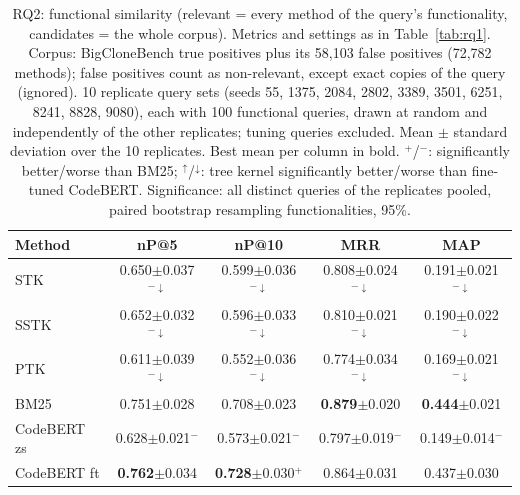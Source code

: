 \begin{table}[!htbp]
\centering
\caption{RQ2: functional similarity (relevant = every method of the query's functionality, candidates = the whole corpus). Metrics and settings as in Table~\ref{tab:rq1}. Corpus: BigCloneBench true positives plus its 58,103 false positives (72,782 methods); false positives count as non-relevant, except exact copies of the query (ignored). 10 replicate query sets (seeds 55, 1375, 2084, 2802, 3389, 3501, 6251, 8241, 8828, 9080), each with 100 functional queries, drawn at random and independently of the other replicates; tuning queries excluded. Mean $\pm$ standard deviation over the 10 replicates. Best mean per column in bold. $^{+}$/$^{-}$: significantly better/worse than BM25; $^{\uparrow}$/$^{\downarrow}$: tree kernel significantly better/worse than fine-tuned CodeBERT. Significance: all distinct queries of the replicates pooled, paired bootstrap resampling functionalities, 95\%.}
\label{tab:rq2}
\footnotesize
\setlength{\tabcolsep}{3.5pt}
\begin{tabular}{lcccc}
\toprule
Method & nP@5 & nP@10 & MRR & MAP \\
\midrule
STK & 0.650$\pm$0.037$^{-\downarrow}$ & 0.599$\pm$0.036$^{-\downarrow}$ & 0.808$\pm$0.024$^{-\downarrow}$ & 0.191$\pm$0.021$^{-\downarrow}$ \\
SSTK & 0.652$\pm$0.032$^{-\downarrow}$ & 0.596$\pm$0.033$^{-\downarrow}$ & 0.810$\pm$0.021$^{-\downarrow}$ & 0.190$\pm$0.022$^{-\downarrow}$ \\
PTK & 0.611$\pm$0.039$^{-\downarrow}$ & 0.552$\pm$0.036$^{-\downarrow}$ & 0.774$\pm$0.034$^{-\downarrow}$ & 0.169$\pm$0.021$^{-\downarrow}$ \\
\midrule
BM25 & 0.751$\pm$0.028 & 0.708$\pm$0.023 & \textbf{0.879}$\pm$0.020 & \textbf{0.444}$\pm$0.021 \\
CodeBERT zs & 0.628$\pm$0.021$^{-}$ & 0.573$\pm$0.021$^{-}$ & 0.797$\pm$0.019$^{-}$ & 0.149$\pm$0.014$^{-}$ \\
CodeBERT ft & \textbf{0.762}$\pm$0.034 & \textbf{0.728}$\pm$0.030$^{+}$ & 0.864$\pm$0.031 & 0.437$\pm$0.030 \\
\bottomrule
\end{tabular}
\end{table}
